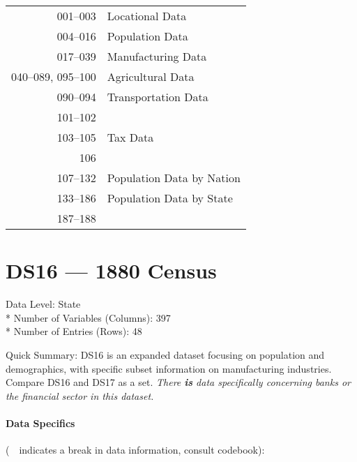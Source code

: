 ﻿\documentclass[12pt]{report}
\begin{document}
	\begin{tabular}{r|l}
		001--003 & Locational Data\\
		004--016 & Population Data\\
		017--039 & Manufacturing Data\\
		040--089, 095--100 & Agricultural Data\\
		090--094 & Transportation Data\\
		101--102 & \guillemotleft~\guillemotright\\
		103--105 & Tax Data\\
		106 & \guillemotleft~\guillemotright\\
		107--132 & Population Data by Nation\\
		133--186 & Population Data by State\\
		187--188 & \guillemotleft~\guillemotright
	\end{tabular}
	\newpage

\section{DS16 --- 1880 Census}
	Data Level: State\\*
	Number of Variables (Columns): 397\\*
	Number of Entries (Rows): 48
	\vspace{1.5em}
	
	\noindent Quick Summary: DS16 is an expanded dataset focusing on population and demographics, with specific subset information on manufacturing industries. Compare DS16 and DS17 as a set. \textit{There \emph{\textbf{is}} data specifically concerning banks or the financial sector in this dataset.}
	
	\paragraph{Data Specifics} (\guillemotleft~\guillemotright~indicates a break in data information, consult codebook):
	\vspace{1em}
	
\end{document}
